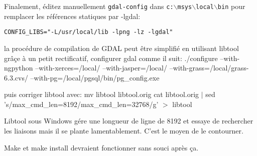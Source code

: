 % 
% 
% 
% 

Finalement, éditez manuellement \texttt{gdal-config} dans \texttt{c:$\backslash$msys$\backslash$local$\backslash$bin} pour remplacer les références statiques par -lgdal:

\begin{verbatim}
CONFIG_LIBS="-L/usr/local/lib -lpng -lz -lgdal"
\end{verbatim}
la procédure de compilation de GDAL peut être simplifié en utilisant libtool grâçe à un petit rectificatif, configurer gdal comme il suit:
./configure --with-ngpython --with-xerces=/local/ --with-jasper=/local/
--with-grass=/local/grass-6.3.cvs/ --with-pg=/local/pgsql/bin/pg\_config.exe 

puis corriger libtool avec:
mv libtool libtool.orig
cat libtool.orig $|$ sed 's/max\_cmd\_len=8192/max\_cmd\_len=32768/g' $>$
libtool

Libtool sous Windows gére une longueur de ligne de 8192 et essaye de rechercher les liaisons mais il se plante lamentablement. C'est le moyen de le contourner.

Make et make install devraient fonctionner sans souci après ça.

% 
% 
% 

